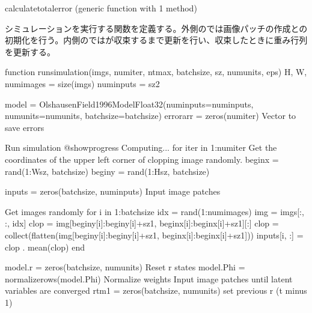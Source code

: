 \documentclass[letterpaper,10pt,english]{sphinxmanual}
\begin{document}
\begin{sphinxVerbatim}[commandchars=\\\{\}]
calculate\PYGZus{}total\PYGZus{}error (generic function with 1 method)
\end{sphinxVerbatim}

シミュレーションを実行する関数を定義する。外側のでは画像パッチの作成との初期化を行う。内側のではが収束するまで更新を行い、収束したときに重み行列を更新する。

\begin{sphinxVerbatim}[commandchars=\\\{\}]
function run\PYGZus{}simulation(imgs, num\PYGZus{}iter, nt\PYGZus{}max, batch\PYGZus{}size, sz, num\PYGZus{}units, eps)
    H, W, num\PYGZus{}images = size(imgs)
    num\PYGZus{}inputs = sz\PYGZca{}2

    model = OlshausenField1996Model\PYGZob{}Float32\PYGZcb{}(num\PYGZus{}inputs=num\PYGZus{}inputs, num\PYGZus{}units=num\PYGZus{}units, batch\PYGZus{}size=batch\PYGZus{}size)
    errorarr = zeros(num\PYGZus{}iter) \PYGZsh{} Vector to save errors    
    
    \PYGZsh{} Run simulation
    @showprogress \PYGZdq{}Computing...\PYGZdq{} for iter in 1:num\PYGZus{}iter
        \PYGZsh{} Get the coordinates of the upper left corner of clopping image randomly.
        beginx = rand(1:W\PYGZhy{}sz, batch\PYGZus{}size)
        beginy = rand(1:H\PYGZhy{}sz, batch\PYGZus{}size)

        inputs = zeros(batch\PYGZus{}size, num\PYGZus{}inputs)  \PYGZsh{} Input image patches

        \PYGZsh{} Get images randomly
        for i in 1:batch\PYGZus{}size        
            idx = rand(1:num\PYGZus{}images)
            img = imgs[:, :, idx]
            clop = img[beginy[i]:beginy[i]+sz\PYGZhy{}1, beginx[i]:beginx[i]+sz\PYGZhy{}1][:]
            \PYGZsh{}clop = collect(flatten(img[beginy[i]:beginy[i]+sz\PYGZhy{}1, beginx[i]:beginx[i]+sz\PYGZhy{}1]))
            inputs[i, :] = clop .\PYGZhy{} mean(clop)
        end

        model.r = zeros(batch\PYGZus{}size, num\PYGZus{}units) \PYGZsh{} Reset r states
        model.Phi = normalize\PYGZus{}rows(model.Phi) \PYGZsh{} Normalize weights
        \PYGZsh{} Input image patches until latent variables are converged 
        r\PYGZus{}tm1 = zeros(batch\PYGZus{}size, num\PYGZus{}units)  \PYGZsh{} set previous r (t minus 1)


\end{sphinxVerbatim}
\end{document}
